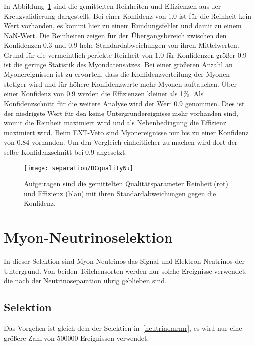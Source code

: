 In Abbildung~\ref{fig:qualitynuvsmuDC} sind die gemittelten Reinheiten und Effizienzen aus der Kreuzvalidierung dargestellt.
Bei einer Konfidenz von 1.0 ist für die Reinheit kein Wert vorhanden, es kommt hier zu einem Rundungsfehler und damit zu einem NaN-Wert.
Die Reinheiten zeigen für den Übergangsbereich zwischen den Konfidenzen 0.3 und 0.9 hohe Standardabweichungen von ihren Mittelwerten.
Grund für die vermeintlich perfekte Reinheit von 1.0 für Konfidenzen größer 0.9 ist die geringe Statistik des Myondatensatzes.
Bei einer größeren Anzahl an Myonereignissen ist zu erwarten, dass die Konfidenzverteilung der Myonen stetiger wird und für höhere Konfidenzwerte mehr Myonen auftauchen.
Über einer Konfidenz von 0.9 werden die Effizienzen kleiner als 1\%.
Als Konfidenzschnitt für die weitere Analyse wird der Wert 0.9 genommen.
Dies ist der niedrigste Wert für den keine Untergrundereignisse mehr vorhanden sind, womit die Reinheit maximiert wird und als Nebenbedingung die Effizienz maximiert wird.
Beim EXT-Veto sind Myonereignisse nur bis zu einer Konfidenz von 0.84 vorhanden. 
Um den Vergleich einheitlicher zu machen wird dort der selbe Konfidenzschnitt bei 0.9 angesetzt.
\begin{figure}
\begin{center}
    \texttt{[image: separation/DCqualityNu]}
\end{center}
\vspace{-2em}
\caption{Aufgetragen sind die gemittelten Qualitätsparameter Reinheit (rot) und Effizienz (blau) mit ihren Standardabweichungen gegen die Konfidenz.}
\label{fig:qualitynuvsmuDC}
\end{figure}



\section{Myon-Neutrinoselektion}
\label{myonselektion}
In dieser Selektion sind Myon-Neutrinos das Signal und Elektron-Neutrinos der Untergrund.
Von beiden Teilchensorten werden nur solche Ereignisse verwendet, die nach der Neutrinoseparation übrig geblieben sind.



\subsection{Selektion}
\label{myonmrmr}
Das Vorgehen ist gleich dem der Selektion in~\ref{neutrinomrmr}, es wird nur eine größere Zahl von $\num{500000}$ Ereignissen verwendet.

